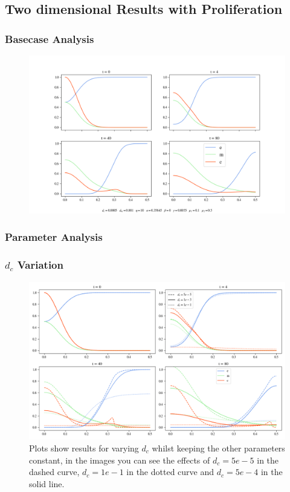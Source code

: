 \subsection{Two dimensional Results with Proliferation}


\subsubsection{Basecase Analysis}

\begin{figure}[h]
    \centering
    \includegraphics[width=\textwidth]{resources/images/basecase_proliferation.png}
    \label{fig:basecase_proliferation}
\end{figure}



\subsubsection{Parameter Analysis}

\subsubsection*{$d_c$ Variation}
\begin{figure}[h]
    \centering
    \includegraphics[width=\textwidth]{resources/images/prolif_dc_variation.png}
    \caption{Plots show results for varying $d_c$ whilst keeping the other parameters constant, in the images you can see the effects of $d_c=5e-5$ in the dashed curve, $d_c=1e-1$ in the dotted curve and $d_c=5e-4$ in the solid line.}
    \label{fig:dc_comparison}
\end{figure}


